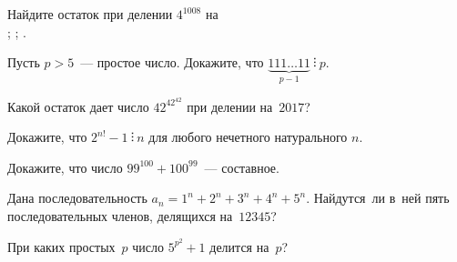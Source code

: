 


\begingroup
    \ifdefined\threedotcolon
        \def\kratno{\mathrel{\threedotcolon}}%
    \fi

\begin{problems}

\item
Найдите остаток при делении $4^{1008}$ на\\
;
\quad
{};
\quad
{}.


\item
Пусть $p > 5$~--- простое число.
Докажите, что
\(
    \underbrace{111{\ldots}11}_{\text{$p-1$}}
\kratno
    p
\).

\item
Какой остаток дает число $42^{42^{42}}$ при делении на~$2017$?

\item
Докажите, что $2^{n!} - 1 \kratno n$ для любого нечетного натурального $n$.

\item
Докажите, что число $99^{100} + 100^{99}$~--- составное.

\item
Дана последовательность $a_n = 1^n + 2^n + 3^n + 4^n + 5^n$.
Найдутся~ли в~ней пять последовательных членов, делящихся на~$12345$?

\item
При каких простых~$p$ число $5^{p^2} + 1$ делится на~$p$?





\end{problems}
